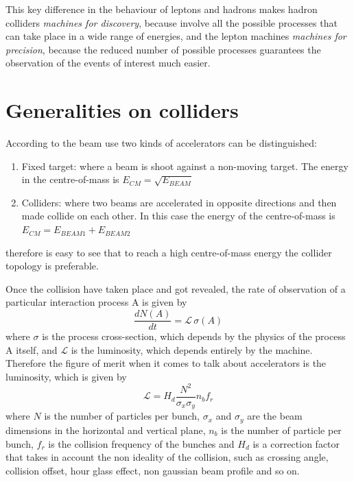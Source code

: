This key difference in the behaviour of leptons and hadrons makes hadron colliders \textit{machines for discovery}, because involve all the possible processes that can take place in a wide range of energies, and the lepton machines \textit{machines for precision}, because the reduced number of possible processes guarantees the observation of the events of interest much easier.

\section{Generalities on colliders}

According to the beam use two kinds of accelerators can be distinguished: 
\begin{enumerate}
\item Fixed target: where a beam is shoot against a non-moving target. The energy in the centre-of-mass is $E_{CM} = \sqrt{E_{BEAM}}$
\item Colliders: where two beams are accelerated in opposite directions and then made collide on each other. In this case the energy of the centre-of-mass is $E_{CM} = E_{BEAM 1} + E_{BEAM 2}$
\end{enumerate}
therefore is easy to see that to reach a high centre-of-mass energy the collider topology is preferable.

Once the collision have taken place and got revealed, the rate of observation of  a particular interaction process A is given by
\begin{equation}
\frac{dN(A)}{dt} = \mathscr{L} \, \sigma(A)
\end{equation}
where $\sigma$ is the process cross-section, which depends by the physics of the process A itself, and $\mathscr{L}$ is the luminosity, which depends entirely by the machine.
Therefore the figure of merit when it comes to talk about accelerators is the luminosity, which is given by
\begin{equation}
\mathscr{L} = H_d \frac{N^2}{\sigma_x \sigma_y} n_b f_r
\end{equation}
where $N$ is the number of particles per bunch, $\sigma_x$ and $\sigma_y$ are the beam dimensions in the horizontal and vertical plane, $n_b$ is the number of particle per bunch, $f_r$ is the collision frequency of the bunches and $H_d$ is a correction factor that takes in account the non ideality of the collision, such as crossing angle, collision offset, hour glass effect, non gaussian beam profile and so on.

